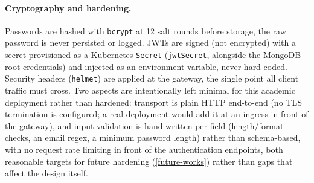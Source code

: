 \paragraph{Cryptography and hardening.} Passwords are hashed with
\texttt{bcrypt} at 12 salt rounds before storage, the raw password is never
persisted or logged. JWTs are signed (not encrypted) with a secret provisioned
as a Kubernetes \texttt{Secret} (\texttt{jwtSecret}, alongside the MongoDB
root credentials) and injected as an environment variable, never hard-coded.
Security headers (\texttt{helmet}) are applied at the gateway, the
single point all client traffic must cross. Two aspects are intentionally
left minimal for this academic deployment rather than hardened: transport is
plain HTTP end-to-end (no TLS termination is configured; a real deployment
would add it at an ingress in front of the gateway), and input validation is
hand-written per field (length/format checks, an email regex, a minimum
password length) rather than schema-based, with no request rate limiting in
front of the authentication endpoints, both reasonable targets for
future hardening (\cref{future-works}) rather than gaps that affect the design itself.
